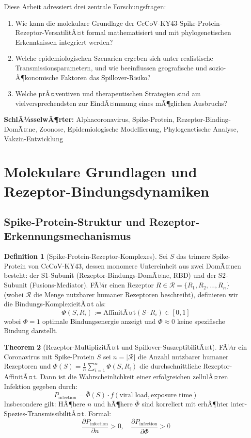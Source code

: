 ﻿\documentclass[11pt,a4paper]{article}
\theoremstyle{definition}
\newtheorem{theorem}{Theorem}[section]
\newtheorem{definition}[theorem]{Definition}
\begin{document}
Diese Arbeit adressiert drei zentrale Forschungsfragen:
\begin{enumerate}
\item Wie kann die molekulare Grundlage der CcCoV-KY43-Spike-Protein-Rezeptor-VersatilitÃ¤t formal mathematisiert und mit phylogenetischen Erkenntnissen integriert werden?
\item Welche epidemiologischen Szenarien ergeben sich unter realistische Transmissionsparametern, und wie beeinflussen geografische und sozio-Ã¶konomische Faktoren das Spillover-Risiko?
\item Welche prÃ¤ventiven und therapeutischen Strategien sind am vielversprechendsten zur EindÃ¤mmung eines mÃ¶glichen Ausbruchs?
\end{enumerate}

\textbf{SchlÃ¼sselwÃ¶rter:} Alphacoronavirus, Spike-Protein, Rezeptor-Binding-DomÃ¤ne, Zoonose, Epidemiologische Modellierung, Phylogenetische Analyse, Vakzin-Entwicklung

\section{Molekulare Grundlagen und Rezeptor-Bindungsdynamiken}

\subsection{Spike-Protein-Struktur und Rezeptor-Erkennungsmechanismus}

\begin{definition}[Spike-Protein-Rezeptor-Komplexes]
Sei $S$ das trimere Spike-Protein von CcCoV-KY43, dessen monomere Untereinheit aus zwei DomÃ¤nen besteht: der S1-Subunit (Rezeptor-Bindungs-DomÃ¤ne, RBD) und der S2-Subunit (Fusions-Mediator). FÃ¼r einen Rezeptor $R \in \mathcal{R} = \{R_1, R_2, \ldots, R_n\}$ (wobei $\mathcal{R}$ die Menge nutzbarer humaner Rezeptoren beschreibt), definieren wir die Bindungs-KomplexieitÃ¤t als:
\[
\Phi(S, R_i) := \text{AffinitÃ¤t}(S \cdot R_i) \in [0, 1]
\]
wobei $\Phi = 1$ optimale Bindungsenergie anzeigt und $\Phi \approx 0$ keine spezifische Bindung darstellt.
\end{definition}

\begin{theorem}[Rezeptor-MultiplizitÃ¤t und Spillover-SuszeptibilitÃ¤t]
\label{thm:receptor_multiplicity}
FÃ¼r ein Coronavirus mit Spike-Protein $S$ sei $n = |\mathcal{R}|$ die Anzahl nutzbarer humaner Rezeptoren und $\bar{\Phi}(S) = \frac{1}{n} \sum_{i=1}^{n} \Phi(S, R_i)$ die durchschnittliche Rezeptor-AffinitÃ¤t. Dann ist die Wahrscheinlichkeit einer erfolgreichen zellulÃ¤ren Infektion gegeben durch:
\[
P_{\text{infection}} = \bar{\Phi}(S) \cdot f(\text{viral load}, \text{exposure time})
\]
Insbesondere gilt: HÃ¶here $n$ und hÃ¶here $\bar{\Phi}$ sind korreliert mit erhÃ¶hter inter-Spezies-TransmissibilitÃ¤t. Formal: 
\[
\frac{\partial P_{\text{infection}}}{\partial n} > 0, \quad \frac{\partial P_{\text{infection}}}{\partial \bar{\Phi}} > 0
\]
\end{theorem}
\end{document}
